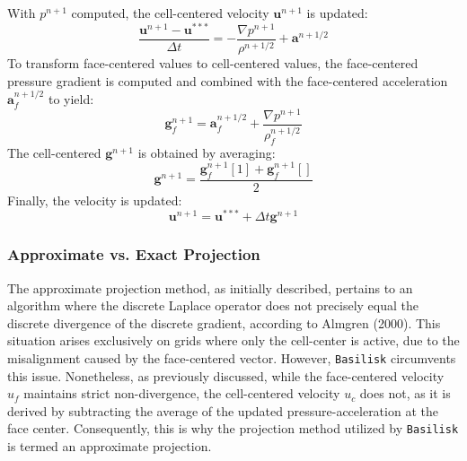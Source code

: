 \documentclass[a4paper]{article}
\newcommand{\para}[1]{\textbf{\emph{\textcolor{para}{#1}}}}
\begin{document}
With $p^{n+1}$ computed, the cell-centered velocity $\mathbf{u}^{n+1}$ is updated:  
\begin{equation}
    \frac{\mathbf{u}^{n+1} - \mathbf{u}^{***}}{\Delta t} = -\frac{\nabla
    p^{n+1}}{\rho^{n+1/2}} + \mathbf{a}^{n+1/2}
\end{equation}  
To transform face-centered values to cell-centered values, the face-centered pressure gradient is computed and combined with the face-centered acceleration $\mathbf{a}_f^{n+1/2}$ to yield:  
\begin{equation}
    \mathbf{g}_f^{n+1} = \mathbf{a}_f^{n+1/2} + \frac{\nabla p^{n+1}}{\rho_f^{n+1/2}}
\end{equation}  
The cell-centered $\mathbf{g}^{n+1}$ is obtained by averaging:  
\begin{equation}
    \mathbf{g}^{n+1} = \frac{\mathbf{g}_f^{n+1}[1] + \mathbf{g}_f^{n+1}[]}{2}
\end{equation}  
Finally, the velocity is updated:  
\begin{equation}
    \mathbf{u}^{n+1} = \mathbf{u}^{***} + \Delta t \mathbf{g}^{n+1}
\end{equation}  

\subsubsection{Approximate vs. Exact Projection}  
The approximate projection method, as initially described, pertains to an algorithm where the discrete Laplace operator does not precisely equal the discrete divergence of the discrete gradient, according to Almgren (2000)\cite{2000_Almgren}. This situation arises exclusively on grids where only the cell-center is active, due to the misalignment caused by the face-centered vector. However, \texttt{Basilisk} circumvents this issue. Nonetheless, as previously discussed, while the face-centered velocity \para{$u_f$} maintains strict non-divergence, the cell-centered velocity \para{$u_c$} does not, as it is derived by subtracting the average of the updated pressure-acceleration at the face center. Consequently, this is why the projection method utilized by \texttt{Basilisk} is termed an approximate projection.

\printbibliography
\end{document}
